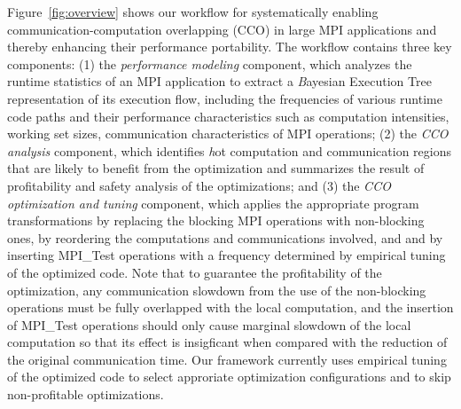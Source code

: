 Figure~\ref{fig:overview} shows our workflow for systematically enabling communication-computation overlapping (CCO) in large MPI
applications and thereby enhancing their performance portability.
The workflow contains three key components:  (1) the \emph{performance modeling} component,
which analyzes the runtime statistics of an MPI application to extract a {\emph Bayesian Execution Tree\cite{jichi:ipdps14}} representation of
its execution flow, including the frequencies of various runtime code paths and their performance characteristics such as computation intensities,
working set sizes,  communication characteristics of MPI operations;
(2) the \emph{CCO analysis} component, which identifies {\emph hot} computation and communication regions
 that are likely to benefit from the optimization and  summarizes the result of profitability and safety analysis of the optimizations;
and (3) the \emph{CCO optimization and tuning} component, which applies the appropriate program transformations by replacing the blocking MPI operations with
non-blocking ones, by reordering the computations and communications involved, and
  and by inserting MPI\_Test operations with a frequency determined by empirical tuning of the optimized code.
Note that to guarantee the profitability of the optimization,
any communication slowdown from the use of the non-blocking operations must be fully overlapped with the local computation,
and the insertion of MPI\_Test operations should only cause marginal slowdown of the local computation so that its effect is
insigficant when compared with the reduction of the original communication time.
Our framework currently uses empirical tuning of the optimized code to select approriate optimization configurations and to skip non-profitable optimizations.

